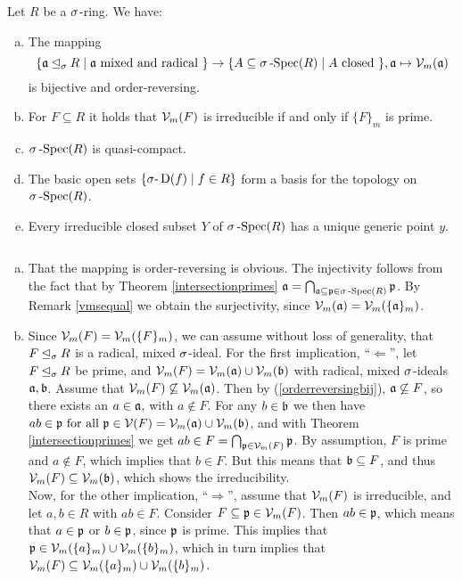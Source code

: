 \begin{prop}
Let $R$ be a $\sigma$-ring. We have:
\begin{enumerate}[(a)]
\item \label{vmbijection} The mapping 
$$\{ \mathfrak{a} \unlhd_{\sigma} R \mid \mathfrak{a}\text{ mixed and radical }\} \rightarrow \{ A \subseteq \sigma\operatorname{-Spec}(R) \mid A \text{ closed }\}, \mathfrak{a} \mapsto \mathcal{V}_m(\mathfrak{a})$$
 is bijective and order-reversing.
\item \label{irred=prime} For $F \subseteq R$ it holds that $\mathcal{V}_m(F)$ is irreducible if and only if $\{F\}_m$ is prime.
\item $\sigma\operatorname{-Spec}(R)$ is quasi-compact.
\item The basic open sets $\{ \sigma\text{-}\operatorname{D}(f) \mid f \in R \}$ form a basis for the topology on $\sigma\operatorname{-Spec}(R)$.
\item Every irreducible closed subset $Y$ of $\sigma\operatorname{-Spec}(R)$ has a unique generic point $y$.
\end{enumerate}
\clearpage %
\begin{bew} $~$
\begin{enumerate}[(a)]
\item \label{orderreversingbij} That the mapping is order-reversing is obvious. The injectivity follows from the fact that by Theorem \ref{intersectionprimes} $\mathfrak{a} = \bigcap_{\mathfrak{a} \subseteq \mathfrak{p} \in \sigma\operatorname{-Spec}(R)} \mathfrak{p}$. By Remark \ref{vmsequal} we obtain the surjectivity,
 since $\mathcal{V}_m(\mathfrak{a}) = \mathcal{V}_m(\{\mathfrak{a}\}_m)$.
\item Since $\mathcal{V}_m(F) = \mathcal{V}_m(\{F\}_m)$, we can assume without loss of generality, that $F \unlhd_{\sigma} R$ is a radical, mixed $\sigma$-ideal.
For the first implication, ``$\Leftarrow$'', let $F \unlhd_{\sigma} R$ be prime, and $\mathcal{V}_m(F) = \mathcal{V}_m(\mathfrak{a}) \cup \mathcal{V}_m(\mathfrak{b})$ with radical, mixed $\sigma$-ideals $\mathfrak{a}, \mathfrak{b}$. Assume that $\mathcal{V}_m(F) \not\subseteq \mathcal{V}_m(\mathfrak{a})$. Then by (\ref{orderreversingbij}), $\mathfrak{a} \not \subseteq F$, so there exists an $a \in \mathfrak{a}$, with $a \notin F$.
For any $b \in \mathfrak{b}$ we then have $ab \in \mathfrak{p} \text{ for all } \mathfrak{p} \in \mathcal{V}(F) = \mathcal{V}_m(\mathfrak{a}) \cup \mathcal{V}_m(\mathfrak{b})$, and with Theorem \ref{intersectionprimes} we get $ab \in F = \bigcap_{\mathfrak{p} \in \mathcal{V}_m(F)}\mathfrak{p}$. By assumption, $F$ is prime and $a \notin F$, which implies
 that  $b \in F$. But this means that $\mathfrak{b} \subseteq F$, and thus $\mathcal{V}_m(F) \subseteq \mathcal{V}_m(\mathfrak{b})$, which shows the irreducibility. \\
\indent Now, for the other implication, ``$\Rightarrow$'', assume that $\mathcal{V}_m(F)$ is irreducible, and let $a,b \in R$ with $ab \in F$. Consider $F \subseteq \mathfrak{p} \in \mathcal{V}_m(F)$. Then $ab \in \mathfrak{p}$, 
which means that $a \in \mathfrak{p}$ or $b \in \mathfrak{p}$, since $\mathfrak{p}$ is prime. This implies that $\mathfrak{p} \in \mathcal{V}_m(\{a\}_m) \cup \mathcal{V}_m(\{b\}_m)$, which in turn implies that $\mathcal{V}_m(F) \subseteq \mathcal{V}_m(\{a\}_{m}) \cup \mathcal{V}_m(\{b\}_{m})$.

\end{enumerate}
\end{bew}
\end{prop}
